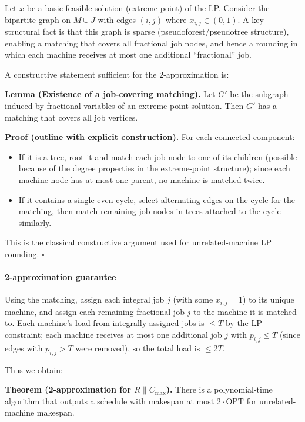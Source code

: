 Let \(x\) be a basic feasible solution (extreme point) of the LP. Consider the bipartite graph on \(M\cup J\) with edges \((i,j)\) where \(x_{i,j}\in(0,1)\). A key structural fact is that this graph is sparse (pseudoforest/pseudotree structure), enabling a matching that covers all fractional job nodes, and hence a rounding in which each machine receives at most one additional ``fractional'' job.

A constructive statement sufficient for the 2-approximation is:

\textbf{Lemma (Existence of a job-covering matching).} Let \(G'\) be the subgraph induced by fractional variables of an extreme point solution. Then \(G'\) has a matching that covers all job vertices.

\textbf{Proof (outline with explicit construction).} For each connected component:
\begin{itemize}
\item If it is a tree, root it and match each job node to one of its children (possible because of the degree properties in the extreme-point structure); since each machine node has at most one parent, no machine is matched twice.
\item If it contains a single even cycle, select alternating edges on the cycle for the matching, then match remaining job nodes in trees attached to the cycle similarly.
\end{itemize}
This is the classical constructive argument used for unrelated-machine LP rounding. \(\square\)

\paragraph{2-approximation guarantee}

Using the matching, assign each integral job \(j\) (with some \(x_{i,j}=1\)) to its unique machine, and assign each remaining fractional job \(j\) to the machine it is matched to. Each machine's load from integrally assigned jobs is \(\le T\) by the LP constraint; each machine receives at most one additional job \(j\) with \(p_{i,j}\le T\) (since edges with \(p_{i,j}>T\) were removed), so the total load is \(\le 2T\).

Thus we obtain:

\textbf{Theorem (2-approximation for \(R\parallel C_{\max}\)).} There is a polynomial-time algorithm that outputs a schedule with makespan at most \(2\cdot \mathrm{OPT}\) for unrelated-machine makespan.

